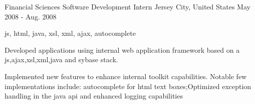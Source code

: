 \cventry
    {Financial Sciences} %
    {Software Development Intern} %
    {Jersey City, United States} %
    {May 2008 - Aug. 2008} %
    {
    \begin{cvitems} %
        \item { js, html, java, xsl, xml, ajax, autocomplete }
        \item { Developed applications using internal web application framework based on a js,ajax,xsl,xml,java and sybase stack. }
        \item { Implemented new features to enhance internal toolkit capabilities. Notable few implementations include: autocomplete for html text boxes;Optimized exception handling in the java api and enhanced logging capabilities }
    \end{cvitems}
    }